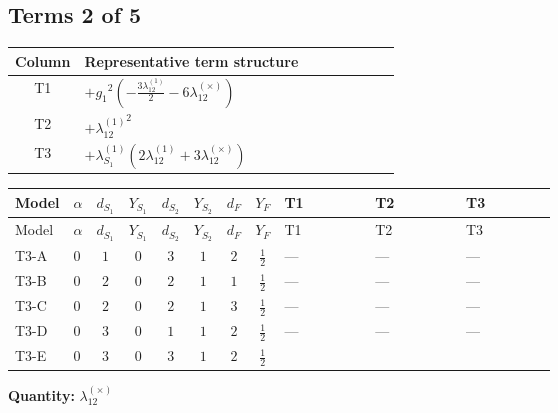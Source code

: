 \documentclass[8pt]{article}
\begin{document}
\begin{landscape}
\subsection*{Terms 2 of 5}
\begin{center}
\begin{tabular}{@{}c >{\raggedright\arraybackslash}p{0.82\linewidth}@{}}
\toprule
Column & Representative term structure \\
\midrule
T1 & \(\displaystyle +{g_1}^2 \left(-\frac{3 {\lambda_{12}^{(1)}}}{2}-6 {\lambda_{12}^{(\times)}}\right)\) \\
\midrule
T2 & \(\displaystyle +{\lambda_{12}^{(1)}}^2\) \\
\midrule
T3 & \(\displaystyle +{\lambda_{S_1}^{(1)}} (2 {\lambda_{12}^{(1)}}+3 {\lambda_{12}^{(\times)}})\) \\
\midrule
\bottomrule
\end{tabular}
\end{center}
\smallskip
\tiny
\begin{longtable}{@{}llcccccc >{\raggedright\arraybackslash}p{0.21\linewidth} >{\raggedright\arraybackslash}p{0.21\linewidth} >{\raggedright\arraybackslash}p{0.21\linewidth}@{}}
\toprule
Model & $\alpha$ & $d_{S_1}$ & $Y_{S_1}$ & $d_{S_2}$ & $Y_{S_2}$ & $d_F$ & $Y_F$ & T1 & T2 & T3 \\
\midrule
\endfirsthead
\toprule
Model & $\alpha$ & $d_{S_1}$ & $Y_{S_1}$ & $d_{S_2}$ & $Y_{S_2}$ & $d_F$ & $Y_F$ & T1 & T2 & T3 \\
\midrule
\endhead
T3-A & $0$ & $1$ & $0$ & $3$ & $1$ & $2$ & $\frac{1}{2}$ & --- & --- & --- \\
\midrule
T3-B & $0$ & $2$ & $0$ & $2$ & $1$ & $1$ & $\frac{1}{2}$ & --- & --- & --- \\
\midrule
T3-C & $0$ & $2$ & $0$ & $2$ & $1$ & $3$ & $\frac{1}{2}$ & --- & --- & --- \\
\midrule
T3-D & $0$ & $3$ & $0$ & $1$ & $1$ & $2$ & $\frac{1}{2}$ & --- & --- & --- \\
\midrule
T3-E & $0$ & $3$ & $0$ & $3$ & $1$ & $2$ & $\frac{1}{2}$ & \scriptsize\adjustbox{max width=\linewidth}{$\begin{gathered} +{g_1}^2 \left(-\frac{3 {\lambda_{12}^{(1)}}}{2}-6 {\lambda_{12}^{(\times)}}\right)\end{gathered}$} & \scriptsize\adjustbox{max width=\linewidth}{$\begin{gathered} +{\lambda_{12}^{(1)}}^2\end{gathered}$} & \scriptsize\adjustbox{max width=\linewidth}{$\begin{gathered} +{\lambda_{S_1}^{(1)}} (2 {\lambda_{12}^{(1)}}+3 {\lambda_{12}^{(\times)}})\end{gathered}$} \\
\midrule
\bottomrule
\end{longtable}
\clearpage
\noindent\textbf{Quantity: }$\lambda_{12}^{(\times)}$\par\smallskip

\end{landscape}
\end{document}

